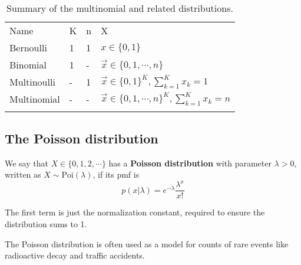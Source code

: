 \begin{table}
\caption{Summary of the multinomial and related distributions.}
\label{tab:multinomial-summary}
\centering
\begin{tabular}{llll}
\hline\noalign{\smallskip}
Name & K & n & X \\
\noalign{\smallskip}\svhline\noalign{\smallskip}
Bernoulli & 1 & 1 & $x \in \{0,1\}$ \\
Binomial & 1 & - & $\vec{x} \in \{0,1,\cdots,n\}$ \\
Multinoulli & - & 1 & $\vec{x} \in \{0,1\}^K, \sum_{k=1}^K x_k=1$ \\
Multinomial & - & - & $\vec{x} \in \{0,1,\cdots,n\}^K, \sum_{k=1}^K x_k=n$ \\
\noalign{\smallskip}\hline
\end{tabular}
\end{table} 


\subsection{The Poisson distribution}
\begin{definition}
We say that $X \in \{0,1,2,\cdots\}$ has a \textbf{Poisson distribution} with parameter $\lambda>0$, written as $X \sim \text{Poi}(\lambda)$, if its pmf is
\begin{equation}
p(x|\lambda)=e^{-\lambda}\dfrac{\lambda^x}{x!}
\end{equation}
\end{definition}

The first term is just the normalization constant, required to ensure the distribution sums to 1.

The Poisson distribution is often used as a model for counts of rare events like radioactive decay and traffic accidents. 

